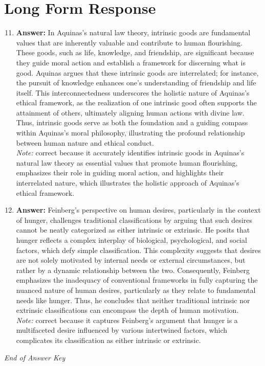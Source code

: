 \documentclass[12pt]{article}
\begin{document}
\section*{Long Form Response}
\begin{enumerate}[label=\arabic*.]
\setcounter{enumi}{10}
\item \textbf{Answer:} In Aquinas's natural law theory, intrinsic goods are fundamental values that are inherently valuable and contribute to human flourishing. These goods, such as life, knowledge, and friendship, are significant because they guide moral action and establish a framework for discerning what is good. Aquinas argues that these intrinsic goods are interrelated; for instance, the pursuit of knowledge enhances one's understanding of friendship and life itself. This interconnectedness underscores the holistic nature of Aquinas's ethical framework, as the realization of one intrinsic good often supports the attainment of others, ultimately aligning human actions with divine law. Thus, intrinsic goods serve as both the foundation and a guiding compass within Aquinas's moral philosophy, illustrating the profound relationship between human nature and ethical conduct.
\\ \textit{Note:} correct because it accurately identifies intrinsic goods in Aquinas's natural law theory as essential values that promote human flourishing, emphasizes their role in guiding moral action, and highlights their interrelated nature, which illustrates the holistic approach of Aquinas's ethical framework.
\item \textbf{Answer:} Feinberg's perspective on human desires, particularly in the context of hunger, challenges traditional classifications by arguing that such desires cannot be neatly categorized as either intrinsic or extrinsic. He posits that hunger reflects a complex interplay of biological, psychological, and social factors, which defy simple classification. This complexity suggests that desires are not solely motivated by internal needs or external circumstances, but rather by a dynamic relationship between the two. Consequently, Feinberg emphasizes the inadequacy of conventional frameworks in fully capturing the nuanced nature of human desires, particularly as they relate to fundamental needs like hunger. Thus, he concludes that neither traditional intrinsic nor extrinsic classifications can encompass the depth of human motivation.
\\ \textit{Note:} correct because it captures Feinberg's argument that hunger is a multifaceted desire influenced by various intertwined factors, which complicates its classification as either intrinsic or extrinsic.
\end{enumerate}

\vfill
\noindent\textit{End of Answer Key}
\end{document}
